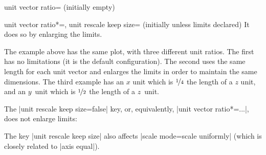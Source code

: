 \begin{pgfplotskey}{unit vector ratio= (initially empty)}
\begin{pgfplotskeylist}{%
		unit vector ratio*=,
		unit rescale keep size= (initially unless limits declared)}
	It does so by enlarging the limits.
\begin{codeexample}[]
\end{codeexample}
	\noindent The example above has the same plot, with three different unit ratios. The first has no limitations (it is the default configuration). The second uses the same length for each unit vector and enlarges the limits in order to maintain the same dimensions. The third example has an $x$ unit which is $\nicefrac14$ the length of a $z$ unit, and an $y$~unit which is $\nicefrac12$ the length of a $z$~unit.

	The |unit rescale keep size=false| key, or, equivalently, |unit vector ratio*=...|, does not enlarge limits:
\begin{codeexample}[]
\end{codeexample}
	The key |unit rescale keep size| also affects |scale mode=scale uniformly| (which is closely related to |axis equal|).


\end{pgfplotskeylist}
\end{pgfplotskey}
